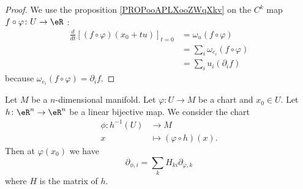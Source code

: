 \begin{proof}
	We use the proposition \ref{PROPooAPLXooZWqXkv} on the \( C^k\) map \(f\circ\varphi \colon U\to \eR  \) :
	\begin{subequations}
		\begin{align}
			\frac{d}{dt} \left[ (f\circ\varphi)(x_0+tu)  \right]_{t=0} & =\omega_u(f\circ\varphi)            \\
			                                                           & =\sum_i\omega_{e_i}(f\circ \varphi) \\
			                                                           & =\sum_iu_i(\partial_if)
		\end{align}
	\end{subequations}
	because \( \omega_{e_i}(f\circ\varphi)=\partial_if\).
\end{proof}


\begin{proposition}	\label{PROPooXVKYooZnoZUp}
	Let \( M\) be a \( n\)-dimensional manifold. Let \(\varphi \colon U\to M  \) be a chart and \( x_0\in U\). Let \(h \colon \eR^n\to \eR^n  \) be a linear bijective map. We consider the chart
	\begin{equation}
		\begin{aligned}
			\phi\colon h^{-1}(U) & \to M                        \\
			x                    & \mapsto (\varphi\circ h)(x).
		\end{aligned}
	\end{equation}
	Then at \( \varphi(x_0)\) we have
	\begin{equation}
		\partial_{\phi,i}=\sum_kH_{ki}\partial_{\varphi,k}
	\end{equation}
	where \( H\) is the matrix of \( h\).
\end{proposition}

